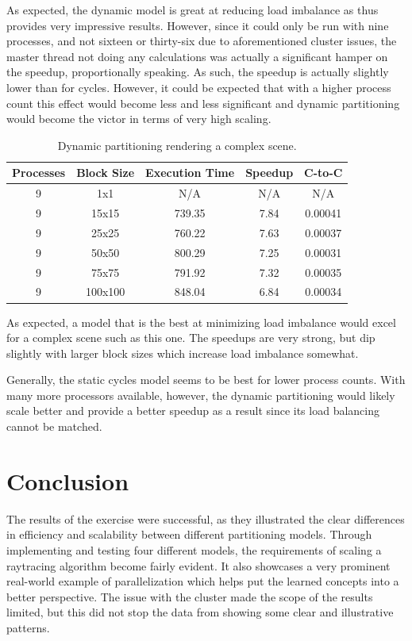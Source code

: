 \documentclass[CMPE]{KGCOEReport}
\begin{document}
\vspace*{1mm}

As expected, the dynamic model is great at reducing load imbalance as thus 
provides very impressive results. However, since it could only be run with 
nine processes, and not sixteen or thirty-six due to aforementioned cluster 
issues, the master thread not doing any calculations was actually a significant 
hamper on the speedup, proportionally speaking. As such, the speedup is 
actually slightly lower than for cycles. However, it could be expected that 
with a higher process count this effect would become less and less significant 
and dynamic partitioning would become the victor in terms of very high scaling.

\vspace*{1mm}

\begin{table}[h]
\centering
\caption{\label{tab:dynamic-complex}Dynamic partitioning rendering a complex scene.}
\begin{tabular}{ccccc}
\hline
Processes & Block Size & Execution Time & Speedup  & C-to-C                  \\
\hline
9 & 1x1     & N/A    & N/A  & N/A \\
9 & 15x15   & 739.35 & 7.84 & 0.00041 \\
9 & 25x25   & 760.22 & 7.63 & 0.00037 \\
9 & 50x50   & 800.29 & 7.25 & 0.00031 \\
9 & 75x75   & 791.92 & 7.32 & 0.00035 \\
9 & 100x100 & 848.04 & 6.84 & 0.00034
\end{tabular}
\end{table}

\vspace*{1mm}

As expected, a model that is the best at minimizing load imbalance would excel 
for a complex scene such as this one. The speedups are very strong, but dip 
slightly with larger block sizes which increase load imbalance somewhat.

Generally, the static cycles model seems to be best for lower process counts. 
With many more processors available, however, the dynamic partitioning would 
likely scale better and provide a better speedup as a result since its load 
balancing cannot be matched.

\section*{Conclusion}

The results of the exercise were successful, as they illustrated the 
clear differences in efficiency and scalability between different partitioning models. 
Through implementing and testing four different models, the requirements of scaling 
a raytracing algorithm become fairly evident. It also showcases a very prominent 
real-world example of parallelization which helps put the learned concepts into a 
better perspective. The issue with the cluster made the scope of the results 
limited, but this did not stop the data from showing some clear and illustrative patterns.
\end{document}
